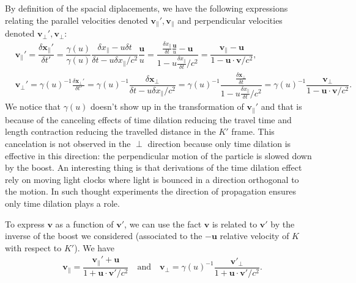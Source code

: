 \documentclass[10pt, a4paper]{article}
\begin{document}
{By definition of the spacial diplacements, we have the following expressions relating the parallel velocities denoted $\textbf{v}_\parallel', \textbf{v}_\parallel$ and perpendicular velocities denoted $\textbf{v}_\perp', \textbf{v}_\perp$: 
\begin{align*}
    &\textbf{v}_\parallel' = \dfrac{\delta \mathbf{x}_\parallel'}{\delta t'} = \dfrac{\gamma(u)}{\gamma(u)} \dfrac{\delta x_\parallel - u \delta t}{\delta t - u \delta x_\parallel/c^2} \dfrac{\mathbf{u}}{u} = \dfrac{\frac{\delta x_\parallel}{\delta t} \frac{\mathbf{u}}{u} - \mathbf{u}}{1 - u \frac{\delta x_\parallel}{\delta t}/c^2} = \dfrac{\mathbf{v}_\parallel - \mathbf{u}}{1 - \mathbf{u} \cdot \mathbf{v}/c^2},\\
    &\textbf{v}_\perp' =\gamma(u)^{-1} \frac{\delta \mathbf{x}_\perp'}{\delta t'} = \gamma(u)^{-1} \dfrac{\delta \mathbf{x}_\perp}{\delta t - u \delta x_\parallel/c^2} = \gamma(u)^{-1} \dfrac{\frac{\delta \mathbf{x}_\perp}{\delta t }}{1 - u \frac{\delta x_\parallel}{\delta t}/c^2} = \gamma(u)^{-1}\dfrac{\textbf{v}_\perp}{1 - \textbf{u} \cdot \textbf{v}/c^2}.
\end{align*}
We notice that $\gamma(u)$ doesn't show up in the transformation of $\textbf{v}_\parallel'$ and that is because of the canceling effects of time dilation reducing the travel time and length contraction reducing the travelled distance in the $K'$ frame. This cancelation is not observed in the $\perp$ direction because only time dilation is effective in this direction: the perpendicular motion of the particle is slowed down by the boost. An interesting thing is that derivations of the time dilation effect rely on moving light clocks where light is bounced in a direction orthogonal to the motion. In such thought experiments the direction of propagation ensures only time dilation plays a role. 

To express $\textbf{v}$ as a function  of $\textbf{v}'$, we can use the fact $\textbf{v}$ is related to $\textbf{v}'$ by the inverse of the boost we considered (associated to the $-\textbf{u}$ relative velocity of $K$ with respect to $K'$). We have 
\begin{align*}
    &\textbf{v}_\parallel = \dfrac{\mathbf{v}_\parallel' + \mathbf{u}}{1 + \mathbf{u} \cdot \mathbf{v}'/c^2} \quad \text{and}\quad \textbf{v}_\perp = \gamma(u)^{-1}\dfrac{\textbf{v}'_\perp}{1 + \textbf{u} \cdot \textbf{v}'/c^2}.
\end{align*}

}
\end{document}
